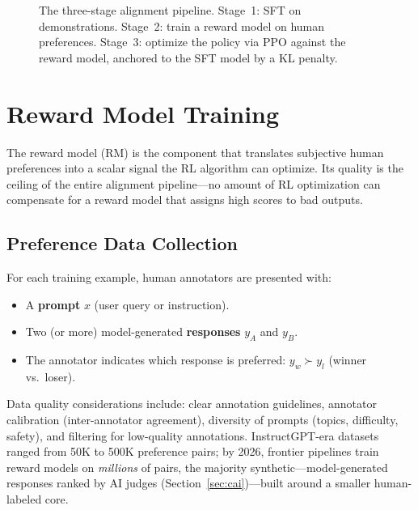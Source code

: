 \begin{figure}[H]
\caption{The three-stage alignment pipeline.  Stage~1: SFT on demonstrations.
Stage~2: train a reward model on human preferences.  Stage~3: optimize the
policy via PPO against the reward model, anchored to the SFT model by a
KL penalty.}
\label{fig:alignment_pipeline}
\end{figure}


\section{Reward Model Training}
\label{sec:reward_model}

The reward model (RM) is the component that translates subjective human
preferences into a scalar signal the RL algorithm can optimize.  Its quality
is the ceiling of the entire alignment pipeline---no amount of RL
optimization can compensate for a reward model that assigns high scores to
bad outputs.

\subsection{Preference Data Collection}

For each training example, human annotators are presented with:
\begin{itemize}[leftmargin=*]
\item A \textbf{prompt} $x$ (user query or instruction).
\item Two (or more) model-generated \textbf{responses} $y_A$ and $y_B$.
\item The annotator indicates which response is preferred: $y_w \succ y_l$
  (winner vs.\ loser).
\end{itemize}

Data quality considerations include: clear annotation guidelines, annotator
calibration (inter-annotator agreement), diversity of prompts (topics,
difficulty, safety), and filtering for low-quality annotations.
InstructGPT-era datasets ranged from 50K to 500K preference pairs; by 2026,
frontier pipelines train reward models on \emph{millions} of pairs, the
majority synthetic---model-generated responses ranked by AI judges
(Section~\ref{sec:cai})---built around a smaller human-labeled core.

